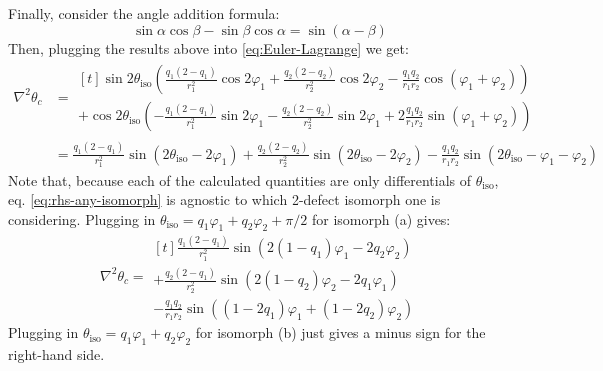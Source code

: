 \documentclass[reqno]{article}
\begin{document}
Finally, consider the angle addition formula:
\begin{equation}
    \sin\alpha \cos\beta - \sin\beta \cos\alpha
    =
    \sin(\alpha - \beta)
\end{equation}
Then, plugging the results above into \eqref{eq:Euler-Lagrange} we get:
\begin{equation} \label{eq:rhs-any-isomorph}
\begin{split}
    \nabla^2 \theta_c
    &=
    \begin{multlined}[t]
    \sin 2 \theta_\text{iso} \left(
        \frac{q_1 \left(2 - q_1 \right)}{r_1^2} \cos 2\varphi_1
        + \frac{q_2 \left(2 - q_2 \right)}{r_2^2} \cos 2\varphi_2
        - \frac{q_1 q_2}{r_1 r_2} \cos \left(\varphi_1 + \varphi_2\right)
    \right) \\
    + \cos 2 \theta_\text{iso} \left(
        -\frac{q_1 \left(2 - q_1\right)}{r_1^2} \sin 2\varphi_1
        - \frac{q_2 \left(2 - q_2\right)}{r_2^2} \sin 2\varphi_1
        + 2 \frac{q_1 q_2}{r_1 r_2}\sin\left(\varphi_1 + \varphi_2\right) 
    \right)
    \end{multlined} \\
    &=
    \frac{q_1 \left(2 - q_1 \right)}{r_1^2} \sin (2 \theta_\text{iso} - 2 \varphi_1)
    + \frac{q_2 \left(2 - q_2 \right)}{r_2^2} \sin (2 \theta_\text{iso} - 2 \varphi_2)
    - \frac{q_1 q_2}{r_1 r_2} \sin(2 \theta_\text{iso} - \varphi_1 - \varphi_2) 
\end{split}
\end{equation}
Note that, because each of the calculated quantities are only differentials of $\theta_\text{iso}$, eq. \eqref{eq:rhs-any-isomorph} is agnostic to which 2-defect isomorph one is considering.
Plugging in $\theta_\text{iso} = q_1 \varphi_1 + q_2 \varphi_2 + \pi/2$ for isomorph (a) gives:
\begin{equation}
    \nabla^2 \theta_c
    =
    \begin{multlined}[t]
        \frac{q_1 \left(2 - q_1 \right)}{r_1^2} \sin (2 (1 - q_1) \varphi_1 - 2 q_2 \varphi_2) \\
        + \frac{q_2 \left(2 - q_1 \right)}{r_2^2} \sin (2 (1 - q_2) \varphi_2 - 2 q_1 \varphi_1) \\
        - \frac{q_1 q_2}{r_1 r_2} \sin((1 - 2q_1) \varphi_1 + (1 - 2 q_2) \varphi_2) 
    \end{multlined}
\end{equation}
Plugging in $\theta_\text{iso} = q_1 \varphi_1 + q_2 \varphi_2$ for isomorph (b) just gives a minus sign for the right-hand side.
\end{document}
